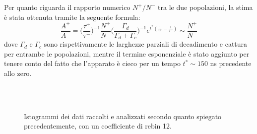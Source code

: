 \documentclass[10pt, oneside, a4paper]{article}   	%
\begin{document}
Per quanto riguarda il rapporto numerico $N^+/N^-$ tra le due popolazioni, la stima è stata ottenuta tramite la seguente formula: 
\[\frac{A^+}{A^-}= \bigg ( \frac{\tau^+}{\tau^-} \bigg )  ^{-1} \frac{N^+}{N^-} \bigg ( \frac{\Gamma_d}{\Gamma_d+\Gamma_c} \bigg )^{-1}e^{t^*\left(\frac{1}{\tau^+}-\frac{1}{\tau^-}\right)}\sim\frac{N^+}{N^-}\]
dove $\Gamma_d$ e $\Gamma_c$ sono rispettivamente le larghezze parziali di decadimento e cattura per entrambe le popolazioni, mentre il termine esponenziale è stato aggiunto per tenere conto del fatto che l'apparato è cieco per un tempo $t^* \sim 150$ ns precedente allo zero.
%
\begin{figure}[H]
\centering
{} \\
 \\
\caption{Istogrammi dei dati raccolti e analizzati secondo quanto spiegato precedentemente, con un coefficiente di rebin 12.}
\label{fig::histo}
\end{figure}
\end{document}
